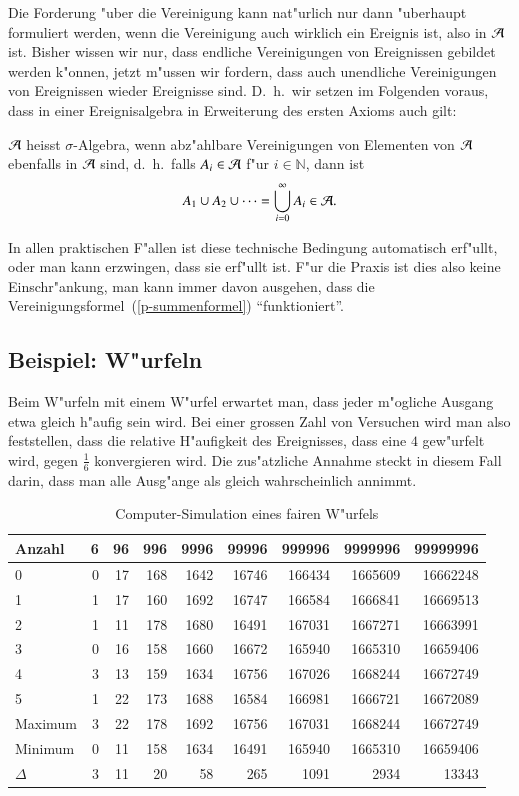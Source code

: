 Die Forderung "uber die Vereinigung kann nat"urlich nur dann "uberhaupt
formuliert werden, wenn die Vereinigung auch wirklich ein Ereignis ist, also in
$\cal A$ ist.
Bisher wissen wir nur, dass endliche
Vereinigungen von Ereignissen gebildet werden k"onnen, jetzt m"ussen
wir fordern, dass
auch unendliche Vereinigungen von Ereignissen wieder Ereignisse sind.
D.~h.~wir setzen im Folgenden voraus, dass in einer
Ereignisalgebra in Erweiterung des ersten Axioms auch gilt:

\begin{definition}
$\cal A$ heisst 
$\sigma$-Algebra, wenn 
abz"ahlbare Vereinigungen von Elementen von $\cal A$ ebenfalls
in $\cal A$ sind, d.~h.~falls $A_i\in{\cal A}$ f"ur $i\in\mathbb{N}$, dann ist
\[
A_1\cup A_2\cup\dots=\bigcup_{i=0}^{\infty}A_i \in{\cal A}.
\]
\end{definition}

In allen praktischen F"allen ist diese technische Bedingung automatisch
erf"ullt, oder man kann erzwingen, dass sie erf"ullt ist.
F"ur die Praxis ist dies also keine Einschr"ankung, man kann immer davon
ausgehen, dass die Vereinigungsformel~(\ref{p-summenformel}) ``funktioniert''.

\subsection{Beispiel: W"urfeln}
Beim W"urfeln mit einem W"urfel erwartet man, dass jeder m"ogliche
Ausgang etwa gleich h"aufig sein wird.
Bei einer grossen Zahl von
Versuchen wird man also feststellen, dass die relative H"aufigkeit
des Ereignisses, dass eine $4$ gew"urfelt wird, gegen $\frac16$
konvergieren wird.
Die zus"atzliche Annahme steckt in diesem Fall
darin, dass man alle Ausg"ange als gleich wahrscheinlich annimmt.

\begin{table}
\begin{center}
\begin{tabular}{|l|r|r|r|r|r|r|r|r|}
\hline
Anzahl&6&96&996&9996&99996&999996&9999996&99999996\\
\hline
0& 0& 17& 168& 1642& 16746& 166434& 1665609& 16662248\\
1& 1& 17& 160& 1692& 16747& 166584& 1666841& 16669513\\
2& 1& 11& 178& 1680& 16491& 167031& 1667271& 16663991\\
3& 0& 16& 158& 1660& 16672& 165940& 1665310& 16659406\\
4& 3& 13& 159& 1634& 16756& 167026& 1668244& 16672749\\
5& 1& 22& 173& 1688& 16584& 166981& 1666721& 16672089\\
\hline
Maximum& 3& 22& 178& 1692& 16756& 167031& 1668244& 16672749\\
Minimum& 0& 11& 158& 1634& 16491& 165940& 1665310& 16659406\\
$\Delta$& 3& 11& 20& 58& 265& 1091& 2934& 13343\\
\hline
\end{tabular}
\end{center}
\caption{Computer-Simulation eines fairen W"urfels\label{wuerfel-simulation}}
\end{table}

